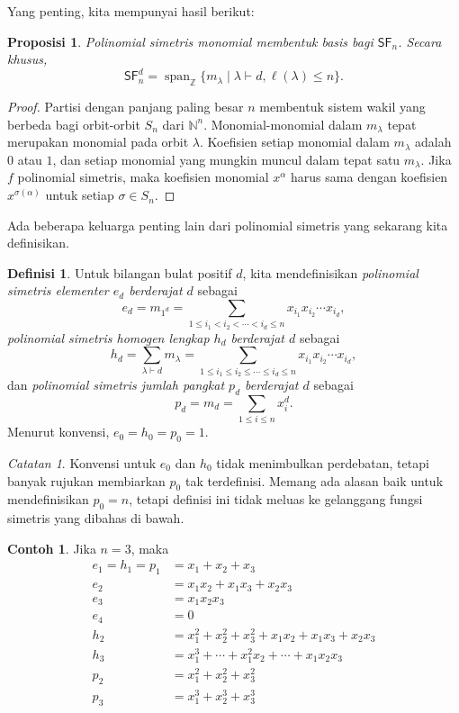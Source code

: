 \documentclass[12pt]{article}
\theoremstyle{plain}
\newtheorem{proposition}[theorem]{Proposisi}
\theoremstyle{definition}
\newtheorem{definition}[theorem]{Definisi}
\newtheorem{example}[theorem]{Contoh}
\theoremstyle{remark}
\newtheorem{remark}[theorem]{Catatan}
\numberwithin{equation}{section}
\begin{document}
Yang penting, kita mempunyai hasil berikut:

\begin{proposition}
Polinomial simetris monomial membentuk basis bagi $\mathsf{SF}_n$.
Secara khusus,
\[
\mathsf{SF}_n^d = \operatorname{span}_{\mathbb{Z}}
\{ m_\lambda \mid \lambda \vdash d, \ell(\lambda) \le n \}.
\]
\end{proposition}

\begin{proof}
Partisi dengan panjang paling besar $n$ membentuk sistem wakil yang berbeda
bagi orbit-orbit $S_n$ dari $\mathbb{N}^n$.
Monomial-monomial dalam $m_\lambda$ tepat merupakan monomial pada orbit
$\lambda$.
Koefisien setiap monomial
dalam $m_\lambda$ adalah $0$ atau $1$, dan setiap monomial yang mungkin
muncul dalam tepat satu $m_\lambda$.
Jika $f$ polinomial simetris, maka koefisien
monomial $x^\alpha$ harus sama dengan koefisien $x^{\sigma(\alpha)}$
untuk setiap $\sigma \in S_n$.  
\end{proof}

Ada beberapa keluarga penting lain dari polinomial simetris
yang sekarang kita definisikan.

\begin{definition}
Untuk bilangan bulat positif $d$, kita mendefinisikan
\emph{polinomial simetris elementer $e_d$ berderajat $d$} sebagai
\[
e_d = m_{1^d} = \sum_{1 \le i_1 < i_2 < \cdots < i_d \le n} x_{i_1}x_{i_2}\cdots
x_{i_d},
\]
\emph{polinomial simetris homogen lengkap $h_d$ berderajat $d$} sebagai
\[
h_d = \sum_{\lambda \vdash d} m_\lambda = \sum_{1 \le i_1 \le i_2 \le \cdots \le i_d \le n} x_{i_1}x_{i_2}\cdots
x_{i_d},
\]
dan \emph{polinomial simetris jumlah pangkat $p_d$ berderajat $d$} sebagai
\[
p_d = m_d = \sum_{1 \le i \le n} x_i^d.
\]
Menurut konvensi, $e_0=h_0=p_0=1$.
\end{definition}

\begin{remark}
Konvensi untuk $e_0$ dan $h_0$ tidak menimbulkan perdebatan,
tetapi banyak rujukan membiarkan $p_0$ tak terdefinisi.
Memang ada alasan baik untuk mendefinisikan $p_0=n$, tetapi definisi ini tidak
meluas ke gelanggang fungsi simetris yang dibahas di bawah. 
\end{remark}

\begin{example}
Jika $n=3$, maka
\begin{align*}
e_1 = h_1 = p_1 &= x_1 + x_2 + x_3\\
e_2 &= x_1x_2 + x_1x_3 + x_2x_3\\
e_3 &= x_1x_2x_3 \\
e_4 &= 0 \\
h_2 &= x_1^2 + x_2^2 + x_3^2 + x_1x_2 + x_1x_3 + x_2x_3\\
h_3 &= x_1^3 + \cdots + x_1^2x_2 + \cdots + x_1x_2x_3\\
p_2 &= x_1^2 + x_2^2 + x_3^2\\
p_3 &= x_1^3 + x_2^3 + x_3^3
\end{align*}
\end{example}
\end{document}
